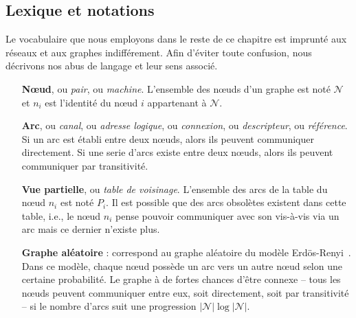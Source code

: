 
\subsection{Lexique et notations}
\label{net:subsec:lexique}

Le vocabulaire que nous employons dans le reste de ce chapitre est imprunté aux
réseaux et aux graphes indifférement. Afin d'éviter toute confusion, nous
décrivons nos abus de langage et leur sens associé.

\begin{itemize}
\item [\textbf{Nœud},] ou \emph{pair}, ou \emph{machine}. L'ensemble des nœuds
  d'un graphe est noté $\mathcal{N}$ et $n_i$ est l'identité du nœud $i$
  appartenant à $\mathcal{N}$.
\item [\textbf{Arc},] ou \emph{canal}, ou \emph{adresse logique}, ou
  \emph{connexion}, ou \emph{descripteur}, ou \emph{référence}. Si un arc est
  établi entre deux nœuds, alors ils peuvent communiquer directement. Si une
  serie d'arcs existe entre deux nœuds, alors ils peuvent communiquer par
  transitivité.
\item [\textbf{Vue partielle},] ou \emph{table de voisinage}. L'ensemble des
  arcs de la table du nœud $n_i$ est noté $P_i$. Il est possible que des arcs
  obsolètes existent dans cette table, i.e., le nœud $n_i$ pense pouvoir
  communiquer avec son vis-à-vis via un arc mais ce dernier n'existe plus.
\item [\textbf{Graphe aléatoire} :] correspond au graphe aléatoire du modèle
  Erdös-Renyi~\cite{erdos1959random}. Dans ce modèle, chaque nœud possède un
  arc vers un autre nœud selon une certaine probabilité. Le graphe à de fortes
  chances d'être connexe -- tous les nœuds peuvent communiquer entre eux, soit
  directement, soit par transitivité -- si le nombre d'arcs suit une progression
  $|\mathcal{N}|\log |\mathcal{N}|$.
\end{itemize}

